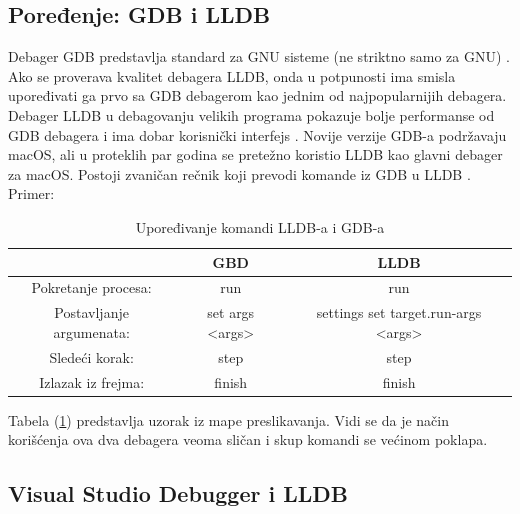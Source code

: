 \documentclass[a4paper]{article}
\begin{document}
\subsection{Poređenje: GDB i LLDB}
\label{subsec: GDB i LLDB}

Debager GDB predstavlja standard za GNU sisteme (ne striktno samo za GNU) \cite{gdb}. Ako se proverava kvalitet debagera LLDB, onda u potpunosti ima smisla upoređivati ga prvo sa GDB debagerom kao jednim od najpopularnijih debagera. Debager LLDB u debagovanju velikih programa pokazuje bolje performanse od GDB debagera i ima dobar korisnički interfejs \cite{lldb_project_blog}. Novije verzije GDB-a podržavaju macOS, ali u proteklih par godina se pretežno koristio LLDB kao glavni debager za macOS. Postoji zvaničan rečnik koji prevodi komande iz GDB u LLDB \cite {lldb_to_gdb_map}. Primer:

\begin{table}
	\begin{center}
	  \label{tab:tabela_lldb_i_gdb}
	  \caption{Upoređivanje komandi LLDB-a i GDB-a} 
	  \begin{tabular}{| c | c | c |}
	  	\hline
	    & \cellcolor{red!60}GBD & \cellcolor{red!60}LLDB \\ 
	    \hline
	    \cellcolor{orange!60}Pokretanje procesa: & \cellcolor{yellow!60}run & \cellcolor{yellow!60}run \\ 
	    \hline 
	    \cellcolor{orange!60}Postavljanje argumenata: & \cellcolor{yellow!60}set args <args>
	    & \cellcolor{yellow!60}settings set target.run-args <args> \\
	    \hline
	    \cellcolor{orange!60}Sledeći korak: & \cellcolor{yellow!60}step & \cellcolor{yellow!60}step \\
	    \hline
	    \cellcolor{orange!60}Izlazak iz frejma: & \cellcolor{yellow!60}finish & \cellcolor{yellow!60}finish\\
	    \hline
	  \end{tabular}
	\end{center}
\end{table}

\indent Tabela (\ref{tab:tabela_lldb_i_gdb}) predstavlja uzorak iz mape preslikavanja. Vidi se da je način korišćenja ova dva debagera veoma sličan i skup komandi se većinom poklapa. 

\subsection{Visual Studio Debugger i LLDB}
\label{subsec: Visual Studio Debugger i LLDB}
\end{document}
